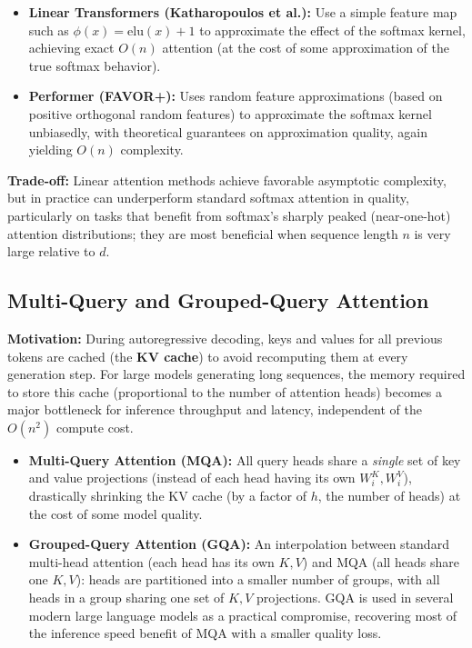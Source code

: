 \documentclass[11pt]{article}
\begin{document}
\begin{itemize}[leftmargin=1.5em]
    \item \textbf{Linear Transformers (Katharopoulos et al.):} Use a simple feature map such as $\phi(x) = \text{elu}(x)+1$ to approximate the effect of the softmax kernel, achieving exact $O(n)$ attention (at the cost of some approximation of the true softmax behavior).
    \item \textbf{Performer (FAVOR+):} Uses random feature approximations (based on positive orthogonal random features) to approximate the softmax kernel unbiasedly, with theoretical guarantees on approximation quality, again yielding $O(n)$ complexity.
\end{itemize}

\textbf{Trade-off:} Linear attention methods achieve favorable asymptotic complexity, but in practice can underperform standard softmax attention in quality, particularly on tasks that benefit from softmax's sharply peaked (near-one-hot) attention distributions; they are most beneficial when sequence length $n$ is very large relative to $d$.

\subsection*{Multi-Query and Grouped-Query Attention}

\textbf{Motivation:} During autoregressive decoding, keys and values for all previous tokens are cached (the \textbf{KV cache}) to avoid recomputing them at every generation step. For large models generating long sequences, the memory required to store this cache (proportional to the number of attention heads) becomes a major bottleneck for inference throughput and latency, independent of the $O(n^2)$ compute cost.

\begin{itemize}[leftmargin=1.5em]
    \item \textbf{Multi-Query Attention (MQA):} All query heads share a \emph{single} set of key and value projections (instead of each head having its own $W_i^K, W_i^V$), drastically shrinking the KV cache (by a factor of $h$, the number of heads) at the cost of some model quality.
    \item \textbf{Grouped-Query Attention (GQA):} An interpolation between standard multi-head attention (each head has its own $K,V$) and MQA (all heads share one $K,V$): heads are partitioned into a smaller number of groups, with all heads in a group sharing one set of $K,V$ projections. GQA is used in several modern large language models as a practical compromise, recovering most of the inference speed benefit of MQA with a smaller quality loss.
\end{itemize}
\end{document}
